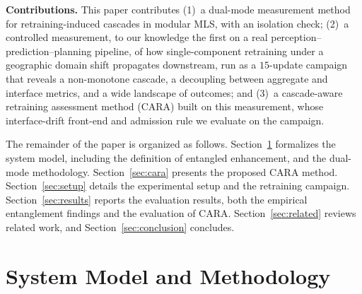 \documentclass[conference]{IEEEtran}
\begin{document}
\textbf{Contributions.} This paper contributes (1)~a dual-mode measurement
method for retraining-induced cascades in modular MLS, with an isolation check;
(2)~a controlled measurement, to our knowledge the first on a real
perception--prediction--planning pipeline, of how single-component retraining
under a geographic domain shift propagates downstream, run as a $15$-update
campaign that reveals a non-monotone cascade, a decoupling between aggregate and
interface metrics, and a wide landscape of outcomes; and (3)~a cascade-aware
retraining assessment method (CARA) built on this measurement, whose
interface-drift front-end and admission rule we evaluate on the campaign.

The remainder of the paper is organized as follows.
Section~\ref{sec:method} formalizes the system model, including the definition
of entangled enhancement, and the dual-mode methodology.
Section~\ref{sec:cara} presents the proposed CARA method.
Section~\ref{sec:setup} details the experimental setup and the retraining
campaign. Section~\ref{sec:results} reports the evaluation results, both the
empirical entanglement findings and the evaluation of CARA.
Section~\ref{sec:related} reviews related work, and
Section~\ref{sec:conclusion} concludes.

\section{System Model and Methodology}
\label{sec:method}
\end{document}
